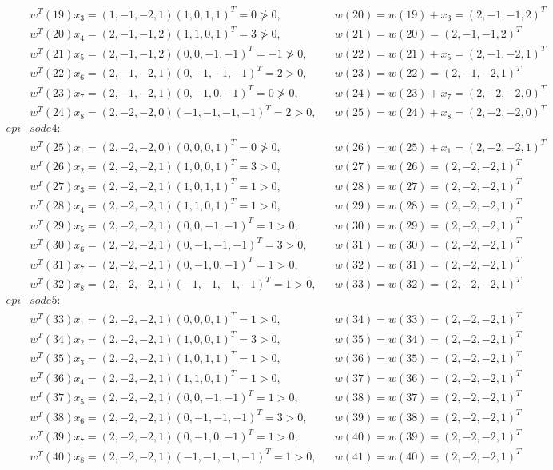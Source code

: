 \documentclass[a4paper, UTF8, 12pt]{ctexart}
\begin{document}
\begin{align*}
            &w^T(19)x_3 = (1,-1,-2,1)(1,0,1,1)^T=0 \not> 0, &&w(20)=w(19)+x_3=(2,-1,-1,2)^T \\
            &w^T(20)x_4 = (2,-1,-1,2)(1,1,0,1)^T=3 \not> 0, &&w(21)=w(20)=(2,-1,-1,2)^T \\ 
            &w^T(21)x_5 = (2,-1,-1,2)(0,0,-1,-1)^T=-1 \not> 0, &&w(22)=w(21)+x_5=(2,-1,-2,1)^T \\
            &w^T(22)x_6 = (2,-1,-2,1)(0,-1,-1,-1)^T=2 > 0, &&w(23)=w(22)=(2,-1,-2,1)^T \\
            &w^T(23)x_7 = (2,-1,-2,1)(0,-1,0,-1)^T=0 \not> 0, &&w(24)=w(23)+x_7=(2,-2,-2,0)^T \\
            &w^T(24)x_8 = (2,-2,-2,0)(-1,-1,-1,-1)^T=2 > 0, &&w(25)=w(24)+x_8=(2,-2,-2,0)^T \\
            epi&sode4: \\
            &w^T(25)x_1 = (2,-2,-2,0)(0,0,0,1)^T=0 \not> 0, &&w(26)=w(25)+x_1=(2,-2,-2,1)^T \\
            &w^T(26)x_2 = (2,-2,-2,1)(1,0,0,1)^T=3 > 0, &&w(27)=w(26)=(2,-2,-2,1)^T \\
            &w^T(27)x_3 = (2,-2,-2,1)(1,0,1,1)^T=1 > 0, &&w(28)=w(27)=(2,-2,-2,1)^T \\
            &w^T(28)x_4 = (2,-2,-2,1)(1,1,0,1)^T=1 > 0, &&w(29)=w(28)=(2,-2,-2,1)^T \\ 
            &w^T(29)x_5 = (2,-2,-2,1)(0,0,-1,-1)^T=1 > 0, &&w(30)=w(29)=(2,-2,-2,1)^T \\
            &w^T(30)x_6 = (2,-2,-2,1)(0,-1,-1,-1)^T=3 > 0, &&w(31)=w(30)=(2,-2,-2,1)^T \\
            &w^T(31)x_7 = (2,-2,-2,1)(0,-1,0,-1)^T=1 > 0, &&w(32)=w(31)=(2,-2,-2,1)^T \\
            &w^T(32)x_8 = (2,-2,-2,1)(-1,-1,-1,-1)^T=1 > 0, &&w(33)=w(32)=(2,-2,-2,1)^T \\
            epi&sode5: \\
            &w^T(33)x_1 = (2,-2,-2,1)(0,0,0,1)^T=1 > 0, &&w(34)=w(33)=(2,-2,-2,1)^T \\
            &w^T(34)x_2 = (2,-2,-2,1)(1,0,0,1)^T=3 > 0, &&w(35)=w(34)=(2,-2,-2,1)^T \\
            &w^T(35)x_3 = (2,-2,-2,1)(1,0,1,1)^T=1 > 0, &&w(36)=w(35)=(2,-2,-2,1)^T \\
            &w^T(36)x_4 = (2,-2,-2,1)(1,1,0,1)^T=1 > 0, &&w(37)=w(36)=(2,-2,-2,1)^T \\ 
            &w^T(37)x_5 = (2,-2,-2,1)(0,0,-1,-1)^T=1 > 0, &&w(38)=w(37)=(2,-2,-2,1)^T \\
            &w^T(38)x_6 = (2,-2,-2,1)(0,-1,-1,-1)^T=3 > 0, &&w(39)=w(38)=(2,-2,-2,1)^T \\
            &w^T(39)x_7 = (2,-2,-2,1)(0,-1,0,-1)^T=1 > 0, &&w(40)=w(39)=(2,-2,-2,1)^T \\
            &w^T(40)x_8 = (2,-2,-2,1)(-1,-1,-1,-1)^T=1 > 0, &&w(41)=w(40)=(2,-2,-2,1)^T 
        \end{align*}
        
\end{document}
